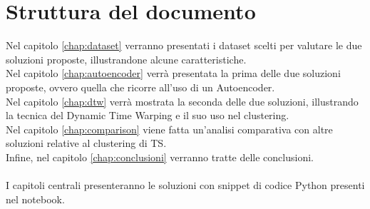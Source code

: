 \section{Struttura del documento}
Nel capitolo \ref{chap:dataset} verranno presentati i dataset scelti per valutare le due soluzioni proposte, illustrandone alcune caratteristiche.\\
Nel capitolo \ref{chap:autoencoder} verrà presentata la prima delle due soluzioni proposte, ovvero quella che ricorre all'uso di un Autoencoder.\\
Nel capitolo \ref{chap:dtw} verrà mostrata la seconda delle due soluzioni, illustrando la tecnica del Dynamic Time Warping e il suo uso nel clustering.\\
Nel capitolo \ref{chap:comparison} viene fatta un'analisi comparativa con altre soluzioni relative al clustering di TS.\\
Infine, nel capitolo \ref{chap:conclusioni} verranno tratte delle conclusioni.\\
\\
I capitoli centrali presenteranno le soluzioni con snippet di codice Python presenti nel notebook.